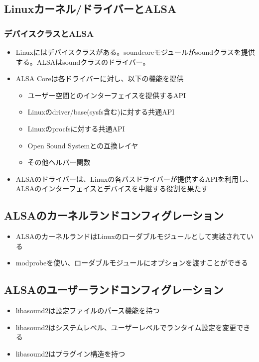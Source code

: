 \documentclass[mingoth,a4paper]{jsarticle}
\begin{document}
\subsection{Linuxカーネル/ドライバーとALSA}
\subsubsection{デバイスクラスとALSA}
\begin{itemize}
\item Linuxにはデバイスクラスがある。soundcoreモジュールがsoundクラスを提供する。ALSAはsoundクラスのドライバー。
\item ALSA Coreは各ドライバーに対し、以下の機能を提供
  \begin{itemize}
  \item ユーザー空間とのインターフェイスを提供するAPI
  \item Linuxのdriver/base(sysfs含む)に対する共通API
  \item Linuxのprocfsに対する共通API
  \item Open Sound Systemとの互換レイヤ
  \item その他ヘルパー関数
  \end{itemize}
\item ALSAのドライバーは、Linuxの各バスドライバーが提供するAPIを利用し、ALSAのインターフェイスとデバイスを中継する役割を果たす
\end{itemize}

\subsection{ALSAのカーネルランドコンフィグレーション}
\begin{itemize}
\item ALSAのカーネルランドはLinuxのローダブルモジュールとして実装されている
\item modprobeを使い、ローダブルモジュールにオプションを渡すことができる
\end{itemize}

\subsection{ALSAのユーザーランドコンフィグレーション}

\begin{itemize}
\item libasound2は設定ファイルのパース機能を持つ
\item libasound2はシステムレベル、ユーザーレベルでランタイム設定を変更できる
\item libasound2はプラグイン構造を持つ
\end{itemize}
\end{document}
